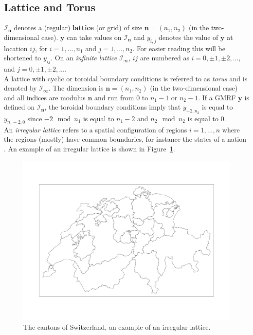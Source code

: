 \subsection{Lattice and Torus}
$\mathcal{I}_{\pmb{n}}$ denotes a (regular) \textbf{lattice} (or grid) of size $\pmb{n}=\left(n_1, n_2\right)$ (in the two-dimensional case). $\pmb{y}$ can take values on $\mathcal{I}_{\pmb{n}}$ and $y_{i,j}$ denotes the value of $\pmb{y}$ at location $ij$, for $i=1,...,n_1$ and $j=1,...,n_2$. For easier reading this will be shortened to $y_{ij}$. On an \textit{infinite lattice} $\mathcal{I}_{\pmb{\infty}}$, $ij$ are numbered as $i=0,\pm1,\pm2,...,$ and $j=0,\pm1,\pm2,...$. \\
A lattice with cyclic or toroidal boundary conditions is referred to as \textit{torus} and is denoted by $\mathcal{I}_{\pmb{\infty}}$. The dimension is $\pmb{n}=\left(n_1,n_2\right)$ (in the two-dimensional case) and all indices are modulus $\pmb{n}$ and run from 0 to $n_1-1$ or $n_2-1$. If a GMRF $\pmb{y}$ is defined on $\mathcal{I}_{\pmb{n}}$, the toroidal boundary conditions imply that $y_{-2,n_2}$ is equal to $y_{n_1-2,0}$ since $-2\mod n_1$ is equal to $n_1-2$ and $n_2\mod n_2$ is equal to 0.\\
An \textit{irregular lattice} refers to a spatial configuration of regions $i=1,...,n$ where the regions (mostly) have common boundaries, for instance the states of a nation \autocite[][15--16]{rue2005gaussian}. An example of an irregular lattice is shown in Figure~\ref{fig:lattice}.
\begin{figure}[H]
   \centering
       \includegraphics[page=1,width=.7\textwidth]{switzerland.pdf}
 \caption{The cantons of Switzerland, an example of an irregular lattice.}
 \label{fig:lattice}
\end{figure}
